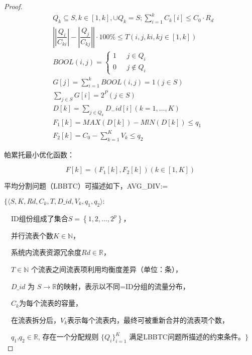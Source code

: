 \begin{proof}
	\begin{align}\label{a2}
	&Q_{k}\subseteq S, k\in \left[ 1,k\right],\cup Q_{k}=S;\sum ^{k}_{i=1}C_{k}\left[ i\right] \leq C_{0}\cdot R_{d}  \\
	&\left| \left| \dfrac {Q_{i}}{C_{ki}}\right| -\left| \dfrac {Q_{j}}{C_{kj}}\right| \right|\cdot 100\%\leq T\left( i, j, ki, kj\in \left[ 1,k\right] \right)  \\
	&BOOL\left(i,j\right)=
	\begin{cases}
	1& \text{ $j \in Q_i$ }\\
	0& \text{ $j \notin Q_i$}
	\end{cases}\\
	&G\left[ j\right] =\sum ^{k}_{i=1}BOOL\left( i,j\right) =1\left( j\in S\right) \\
	&\sum _{j\in S}G\left[ i\right] =2^{P}\left( j\in S\right) \\
	&D\left[ k\right] =\sum _{j\in Q_{k}}D_{-}id\left[ i\right] \left( k=1,\ldots ,K\right)\\
	&F_{1}\left[ k\right] =MAX\left( D\left[ k\right] \right) -MlN\left( D\left[ k\right] \right) \leq q_1 \\
	&F_{2}\left[ k\right] =C_{0}-\sum ^{K}_{k=1}V_{k}\leq q_{2} 
	\end{align}
	
	帕累托最小优化函数：
	
	\begin{equation} \label{a3}
	F\left[ k\right] =\left( F_{1}\left[ k\right] ,F_{2}\left[ k\right] \right) \left( k\in \left[ 1,K\right] \right)
	\end{equation}
	
	
	平均分割问题（LBBTC）可描述如下，AVG\_DIV:=
	
	\noindent $\{ \langle  S, K, Rd, C_k, T, D\_id, V_k, q_1, q_2\rangle:  $
	
	\ \ ID组份组成了集合$S=\left\{ 1,2,\ldots ,2^p\right\}$，
	
	\ \ 并行流表个数$K\in \mathbb{N}$，
	
	\ \ 系统内流表资源冗余度$Rd \in \mathbb{R}$，
	
	\ \ $T \in \mathbb{N}$ 个流表之间流表项利用均衡度差异（单位：条），
	
	\ \ $D\_id$ 为 $S \rightarrow \mathbb{R}$的映射，表示以不同=ID分组的流量分布，
	
	\ \ $C_k$为每个流表的容量，
	
	\ \ 在流表拆分后，$V_k$表示每个流表内，最终可被重新合并的流表项个数， 
	
	\ \ $q_1$,$q_2 \in \mathbb{R}$, 存在一个分配规则 $\{Q_i\}^{K}_{i=1}$ 满足LBBTC问题所描述的约束条件。$\}$
	

\end{proof}
